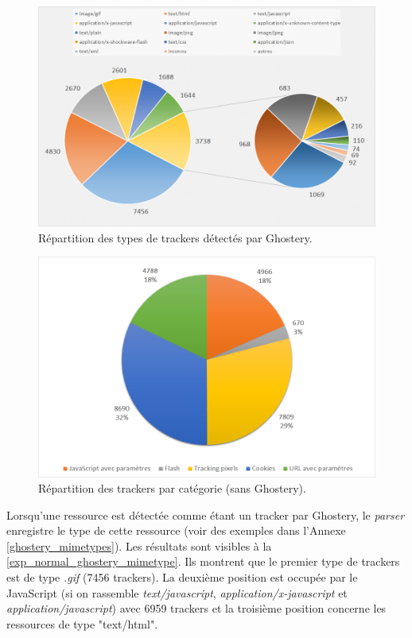 \begin{figure}[!h]
	\centering
	\includegraphics[scale=.6]{resultats/ANALYSES/Images/Normal-Ghostery-mimetype.png}
	\caption{\label{exp_normal_ghostery_mimetype}Répartition des types de trackers détectés par Ghostery.}
\end{figure}

\begin{figure}[!h]
	\centering
	\includegraphics[scale=.6]{resultats/ANALYSES/Images/Normal-NoG.png}
	\caption{\label{exp_normal_nog}Répartition des trackers par catégorie (sans Ghostery).}
\end{figure}

Lorsqu'une ressource est détectée comme étant un tracker par Ghostery, le \textit{parser} enregistre le type de cette ressource (voir des exemples dans l'Annexe \ref{ghostery_mimetypes}). Les résultats sont visibles à la \autoref{exp_normal_ghostery_mimetype}. Ils montrent que le premier type de trackers est de type \textit{.gif} (7456 trackers). La deuxième position est occupée par le JavaScript (si on rassemble \textit{text/javascript}, \textit{application/x-javascript} et \textit{application/javascript}) avec 6959 trackers et la troisième position concerne les ressources de type "text/html".

